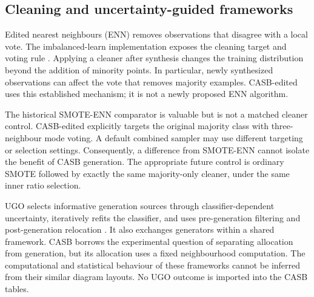 \documentclass[conference]{IEEEtran}
\begin{document}
\subsection{Cleaning and uncertainty-guided frameworks}
Edited nearest neighbours (ENN) removes observations that disagree with a local vote. The imbalanced-learn implementation exposes the cleaning target and voting rule \citep{imblearn}. Applying a cleaner after synthesis changes the training distribution beyond the addition of minority points. In particular, newly synthesized observations can affect the vote that removes majority examples. CASB-edited uses this established mechanism; it is not a newly proposed ENN algorithm.

The historical SMOTE-ENN comparator is valuable but is not a matched cleaner control. CASB-edited explicitly targets the original majority class with three-neighbour mode voting. A default combined sampler may use different targeting or selection settings. Consequently, a difference from SMOTE-ENN cannot isolate the benefit of CASB generation. The appropriate future control is ordinary SMOTE followed by exactly the same majority-only cleaner, under the same inner ratio selection.

UGO selects informative generation sources through classifier-dependent uncertainty, iteratively refits the classifier, and uses pre-generation filtering and post-generation relocation \citep{saglam2026}. It also exchanges generators within a shared framework. CASB borrows the experimental question of separating allocation from generation, but its allocation uses a fixed neighbourhood computation. The computational and statistical behaviour of these frameworks cannot be inferred from their similar diagram layouts. No UGO outcome is imported into the CASB tables.
\end{document}
